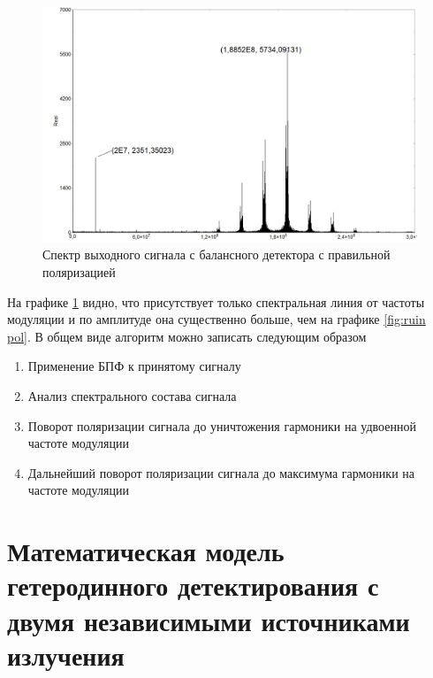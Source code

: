\begin{figure}
    \centering
    \includegraphics[width = \textwidth]{images/normal polarization.png}
    \caption{Спектр выходного сигнала с балансного детектора с правильной поляризацией}
    \label{fig:norm pol}
\end{figure}
На графике \ref{fig:norm pol} видно, что присутствует только спектральная линия от частоты модуляции и по амплитуде она существенно больше, чем на графике \ref{fig:ruin pol}. 
В общем виде алгоритм можно записать следующим образом
\begin{enumerate}
    \item Применение БПФ к принятому сигналу
    \item Анализ спектрального состава сигнала
    \item Поворот поляризации сигнала до уничтожения гармоники на удвоенной частоте модуляции
    \item Дальнейший поворот поляризации сигнала до максимума гармоники на частоте модуляции
\end{enumerate}
\section{Математическая модель гетеродинного детектирования с двумя независимыми источниками излучения}\label{sec:ch3/sect6}
